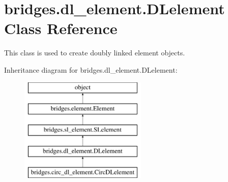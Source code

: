 \hypertarget{classbridges_1_1dl__element_1_1_d_lelement}{}\section{bridges.\+dl\+\_\+element.\+D\+Lelement Class Reference}
\label{classbridges_1_1dl__element_1_1_d_lelement}


This class is used to create doubly linked element objects.  


Inheritance diagram for bridges.\+dl\+\_\+element.\+D\+Lelement\+:\begin{figure}[H]
\begin{center}
\leavevmode
\includegraphics[height=5.000000cm]{classbridges_1_1dl__element_1_1_d_lelement}
\end{center}
\end{figure}
